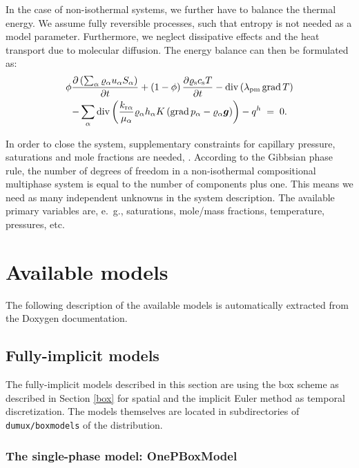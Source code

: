 In the case of non-isothermal systems, we further have to balance the
thermal energy. We assume fully reversible processes, such that entropy
is not needed as a model parameter. Furthermore, we neglect 
dissipative effects and the heat transport due to molecular
diffusion. The energy balance can then be
formulated as:
%
\begin{multline}
  \label{A3:eqenergmak1}
  \phi \frac{\partial \left( \sum_\alpha \varrho_{\alpha}
      u_\alpha S_\alpha \right)}{\partial t} + \left( 1 -
    \phi \right) \frac{\partial \varrho_{\text{s}} c_{\text{s}}
    T}{\partial t}  
 - \operatorname{div} \left( \lambda_{\text{pm}} \operatorname{grad} T \right)
   \\
   - \sum\limits_\alpha \operatorname{div} \left( \frac{k_{\text{r}
        \alpha}}{\mu_\alpha} \varrho_{\alpha} h_\alpha
    K \left( \operatorname{grad} p_\alpha - \varrho_{\alpha}
      \boldsymbol{g} \right) \right)  
 - q^h \; = \; 0.
\end{multline}

In order to close the system, supplementary constraints for capillary pressure, saturations and mole
fractions are needed, \cite{A3:helmig:1997}. 
According to the Gibbsian phase rule, the number of degrees of freedom
in a non-isothermal compositional multiphase system is equal to the
number of components plus one. This means we need as many independent
unknowns in the system description. The
available primary variables are, e.\ g., saturations, mole/mass
fractions, temperature, pressures, etc.




\section{Available models} 
The following description of the available models is automatically extracted 
from the Doxygen documentation.

\subsection{Fully-implicit models} 

The fully-implicit models described in this section are using the box
scheme as described in Section \ref{box} for spatial and the implicit Euler
method as temporal discretization. The models themselves are located in
subdirectories of \texttt{dumux/boxmodels} of the \Dumux distribution.

\subsubsection{The single-phase model: OnePBoxModel} 


